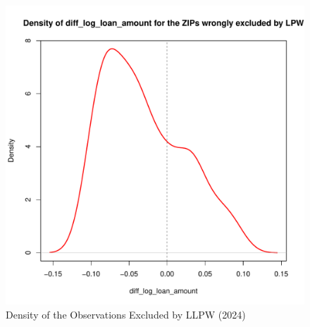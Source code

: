 \documentclass{article}
\begin{document}


\clearpage
\pagebreak

\begin{figure}
    
    \caption{Density of the Observations Excluded by LLPW (2024)}

    \begin{center}
        \includegraphics[scale=0.5]{figures/density_diff_log_loan_amount_excluded_ZIPs.pdf}
    \end{center}

\end{figure}



\clearpage
\pagebreak
\end{document}
